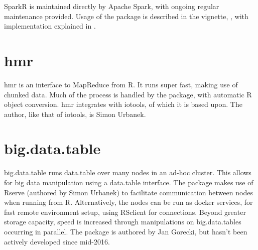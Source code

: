 \documentclass[10pt,a4paper]{article}
\begin{document}
SparkR is maintained directly by Apache Spark, with ongoing regular
maintenance provided. Usage of the package is described in the
vignette, \textcite{venktaraman19:_spark_pract_guide}, with
implementation explained in \textcite{venkataraman2016sparkr}.

\section{hmr}
\label{sec:hmr}

hmr is an interface to MapReduce from R\cite{urbanek20}. It runs super
fast, making use of chunked data. Much of the process is handled by
the package, with automatic R object conversion. hmr integrates with
iotools, of which it is based upon. The author, like that of iotools,
is Simon Urbanek.

\section{big.data.table}
\label{sec:big.data.table}

big.data.table runs data.table over many nodes in an ad-hoc
cluster\cite{gorecki16}. This allows for big data manipulation using a
data.table interface. The package makes use of Rserve (authored by
Simon Urbanek) to facilitate communication between nodes when running
from R. Alternatively, the nodes can be run as docker services, for
fast remote environment setup, using RSclient for connections. Beyond
greater storage capacity, speed is increased through manipulations on
big.data.tables occurring in parallel. The package is authored by Jan
Gorecki, but hasn't been actively developed since mid-2016.

\printbibliography{}
\end{document}

